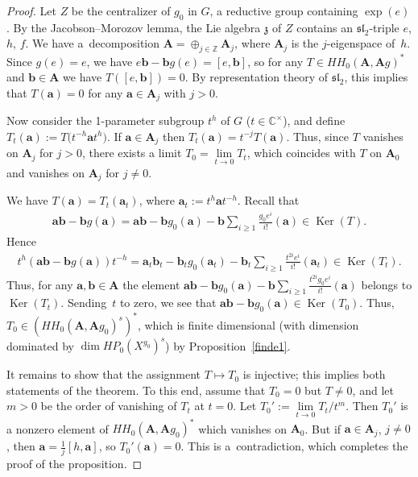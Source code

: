 \begin{proof} Let $Z$ be the centralizer of $g_0$ in $G$, a reductive group containing $\exp(e)$. By the Jacobson--Morozov lemma, the Lie algebra $\mathfrak{z}$ of $Z$ contains an $\mathfrak{sl}_2$-triple
$e$, $h$, $f$. We have a~decomposition ${\mathbf A}=\oplus_{j\in {\mathbb Z}}{\mathbf A}_j$, where ${\mathbf A}_j$ is the $j$-eigenspace of~$h$. Since $g(e)=e$, we have $e{\mathbf b}-{\mathbf b}g(e)=[e,{\mathbf b}]$, so for any $T\in HH_0({\mathbf A},{\mathbf A}g)^*$ and ${\mathbf b}\in {\mathbf A}$ we have $T([e,{\mathbf b}])=0$. By representation theory of $\mathfrak{sl}_2$, this implies that $T({\mathbf a})=0$ for any ${\mathbf a}\in {\mathbf A}_j$ with $j>0$.

Now consider the 1-parameter subgroup $t^h$ of $G$ ($t\in {\mathbb C}^\times$), and define
$T_t({\mathbf a}):=T\big(t^{-h}{\mathbf a}t^h\big)$. If ${\mathbf a}\in {\mathbf A}_j$ then $T_t({\mathbf a})=t^{-j}T({\mathbf a})$. Thus, since $T$ vanishes on ${\mathbf A}_j$ for $j>0$, there exists a limit $T_0=\lim\limits_{t\to 0}T_t$, which coincides with $T$ on ${\mathbf A}_0$ and vanishes on ${\mathbf A}_j$ for $j\ne 0$.

We have $T({\mathbf a})=T_t({\mathbf a}_t)$, where ${\mathbf a}_t:=t^h{\mathbf a} t^{-h}$.
Recall that
\begin{gather*}
{\mathbf a}{\mathbf b}-{\mathbf b} g({\mathbf a})={\mathbf a}{\mathbf b}-{\mathbf b}g_0({\mathbf a})-{\mathbf b}\sum_{i\ge 1}\frac{g_0e^i}{i!}({\mathbf a})\in \operatorname{Ker}(T).
\end{gather*}
Hence
\begin{gather*}
t^h({\mathbf a}{\mathbf b}-{\mathbf b} g({\mathbf a}))t^{-h}={\mathbf a}_t{\mathbf b}_t-{\mathbf b}_t g_0({\mathbf a}_t)-{\mathbf b}_t\sum_{i\ge 1}\frac{t^{2i}e^i}{i!}({\mathbf a}_t)\in \operatorname{Ker}(T_t).
\end{gather*}
Thus, for any ${\mathbf a},{\mathbf b}\in {\mathbf A}$ the element ${\mathbf a}{\mathbf b}- {\mathbf b} g_0({\mathbf a})-{\mathbf b}\sum\limits_{i\ge 1}\frac{t^{2i}g_0e^i}{i!}({\mathbf a})$ belongs to $\operatorname{Ker}(T_t)$. Sending~$t$ to zero, we see that ${\mathbf a}{\mathbf b}-{\mathbf b} g_0({\mathbf a})\in \operatorname{Ker}(T_0)$. Thus, $T_0\in (HH_0({\mathbf A},{\mathbf A}g_0)^s)^*$, which is finite dimensional (with dimension dominated by $\dim HP_0(X^{g_0})^s$) by Proposition~\ref{finde1}.

It remains to show that the assignment $T\mapsto T_0$ is injective; this implies both statements of the theorem. To this end, assume that $T_0=0$ but $T\ne 0$, and let $m>0$ be the order of vanishing of $T_t$ at $t=0$. Let $T_0':=\lim\limits_{t\to 0}T_t/t^m$. Then $T_0'$ is a nonzero element of $HH_0({\mathbf A},{\mathbf A}g_0)^*$ which vanishes on ${\mathbf A}_0$. But if ${\mathbf a}\in {\mathbf A}_j$, $j\ne 0$, then ${\mathbf a}=\frac{1}{j}[h,{\mathbf a}]$, so $T_0'({\mathbf a})=0$. This is a~contradiction, which completes the proof of the proposition.
\end{proof}

